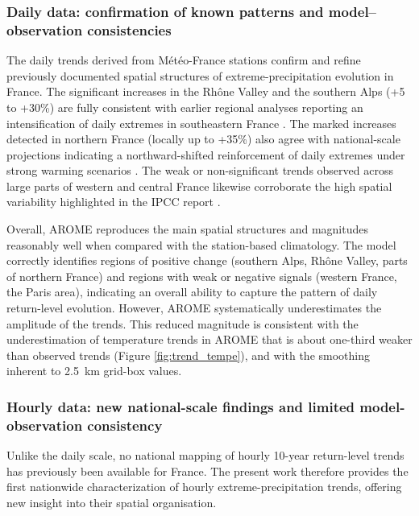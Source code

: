 \documentclass[hess, manuscript]{copernicus}
\begin{document}
\subsubsection{Daily data: confirmation of known patterns and model--observation consistencies}

The daily trends derived from Météo-France stations confirm and refine previously documented spatial structures of extreme-precipitation evolution in France. The significant increases in the Rhône Valley and the southern Alps (+5 to +30\%) are fully consistent with earlier regional analyses reporting an intensification of daily extremes in southeastern France \citep{Blanchet2018,blanchet2021explaining,Ribes2019}. The marked increases detected in northern France (locally up to +35\%) also agree with national-scale projections indicating a northward-shifted reinforcement of daily extremes under strong warming scenarios \citep{soubeyroux:hal-04991790}. The weak or non-significant trends observed across large parts of western and central France likewise corroborate the high spatial variability highlighted in the IPCC report \citep{IPCC2021}.

Overall, AROME reproduces the main spatial structures and magnitudes reasonably well when compared with the station-based climatology. The model correctly identifies regions of positive change (southern Alps, Rhône Valley, parts of northern France) and regions with weak or negative signals (western France, the Paris area), indicating an overall ability to capture the pattern of daily return-level evolution. However, AROME systematically underestimates the amplitude of the trends. This reduced magnitude is consistent with the underestimation of temperature trends in AROME that is about one-third weaker than observed trends (Figure \ref{fig:trend_tempe}), and with the smoothing inherent to 2.5~km grid-box values.

\subsubsection{Hourly data: new national-scale findings and limited model-observation consistency}

Unlike the daily scale, no national mapping of hourly 10-year return-level trends has previously been available for France. The present work therefore provides the first nationwide characterization of hourly extreme-precipitation trends, offering new insight into their spatial organisation.

\end{document}
